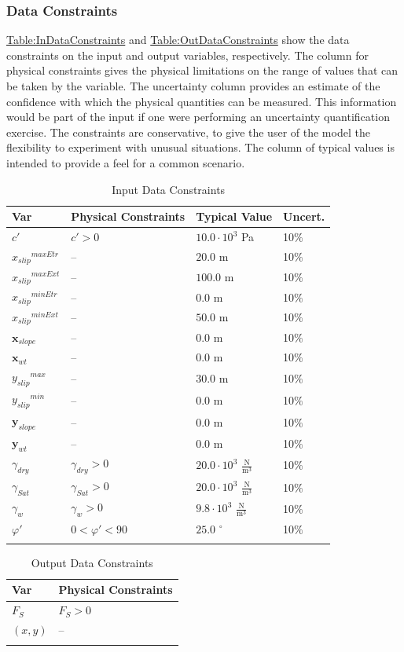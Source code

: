 \documentclass[12pt]{article}
\begin{document}
\subsubsection{Data Constraints}
\label{Sec:DataConstraints}
\hyperref[Table:InDataConstraints]{Table:InDataConstraints} and \hyperref[Table:OutDataConstraints]{Table:OutDataConstraints} show the data constraints on the input and output variables, respectively. The column for physical constraints gives the physical limitations on the range of values that can be taken by the variable. The uncertainty column provides an estimate of the confidence with which the physical quantities can be measured. This information would be part of the input if one were performing an uncertainty quantification exercise. The constraints are conservative, to give the user of the model the flexibility to experiment with unusual situations. The column of typical values is intended to provide a feel for a common scenario.
\begin{longtable}{l l l l}
\toprule
Var & Physical Constraints & Typical Value & Uncert.
\\
\midrule
\endhead
$c'$ & $c'>0$ & $10.0\cdot{}10^{3}$ Pa & 10$\%$
\\
${{x_{slip}}^{maxEtr}}$ & -- & $20.0$ m & 10$\%$
\\
${{x_{slip}}^{maxExt}}$ & -- & $100.0$ m & 10$\%$
\\
${{x_{slip}}^{minEtr}}$ & -- & $0.0$ m & 10$\%$
\\
${{x_{slip}}^{minExt}}$ & -- & $50.0$ m & 10$\%$
\\
${\mathbf{x}_{slope}}$ & -- & $0.0$ m & 10$\%$
\\
${\mathbf{x}_{wt}}$ & -- & $0.0$ m & 10$\%$
\\
${{y_{slip}}^{max}}$ & -- & $30.0$ m & 10$\%$
\\
${{y_{slip}}^{min}}$ & -- & $0.0$ m & 10$\%$
\\
${\mathbf{y}_{slope}}$ & -- & $0.0$ m & 10$\%$
\\
${\mathbf{y}_{wt}}$ & -- & $0.0$ m & 10$\%$
\\
${γ_{dry}}$ & ${γ_{dry}}>0$ & $20.0\cdot{}10^{3}$ $\frac{\text{N}}{\text{m}^{3}}$ & 10$\%$
\\
${γ_{Sat}}$ & ${γ_{Sat}}>0$ & $20.0\cdot{}10^{3}$ $\frac{\text{N}}{\text{m}^{3}}$ & 10$\%$
\\
${γ_{w}}$ & ${γ_{w}}>0$ & $9.8\cdot{}10^{3}$ $\frac{\text{N}}{\text{m}^{3}}$ & 10$\%$
\\
$φ'$ & $0<φ'<90$ & $25.0$ ${}^{\circ}$ & 10$\%$
\\
\bottomrule
\caption{Input Data Constraints}
\label{Table:InDataConstraints}
\end{longtable}
\begin{longtable}{l l}
\toprule
Var & Physical Constraints
\\
\midrule
\endhead
${F_{S}}$ & ${F_{S}}>0$
\\
$(x,y)$ & --
\\
\bottomrule
\caption{Output Data Constraints}
\label{Table:OutDataConstraints}
\end{longtable}
\end{document}
